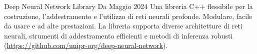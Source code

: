 
\begin{cventries}
	\cventrytool
		{Deep Neural Network Library}
		{Da Maggio 2024}
		{
		Una libreria C++ flessibile per la costruzione, l'addestramento e l'utilizzo di reti neurali profonde. Modulare, facile da usare e ad alte prestazioni. La libreria supporta diverse architetture di reti neurali, strumenti di addestramento efficienti e metodi di inferenza robusti (\url{https://github.com/unipr-org/deep-neural-network}).	
		}
\end{cventries}
